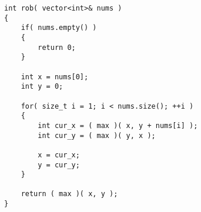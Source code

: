 \setcounter{lstlisting}{0}
\begin{lstlisting}[style=customc, caption={Dynamic Programming}]
int rob( vector<int>& nums )
{
    if( nums.empty() )
    {
        return 0;
    }

    int x = nums[0];
    int y = 0;

    for( size_t i = 1; i < nums.size(); ++i )
    {
        int cur_x = ( max )( x, y + nums[i] );
        int cur_y = ( max )( y, x );

        x = cur_x;
        y = cur_y;
    }

    return ( max )( x, y );
}
\end{lstlisting} 
